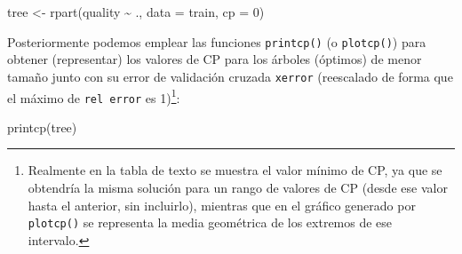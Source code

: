 \documentclass[
  spanish,
]{book}
\newenvironment{Shaded}{\begin{snugshade}}{\end{snugshade}}
\newcommand{\AttributeTok}[1]{\textcolor[rgb]{0.77,0.63,0.00}{#1}}
\newcommand{\DecValTok}[1]{\textcolor[rgb]{0.00,0.00,0.81}{#1}}
\newcommand{\FunctionTok}[1]{\textcolor[rgb]{0.00,0.00,0.00}{#1}}
\newcommand{\NormalTok}[1]{#1}
\newcommand{\OtherTok}[1]{\textcolor[rgb]{0.56,0.35,0.01}{#1}}
\newcommand{\SpecialCharTok}[1]{\textcolor[rgb]{0.00,0.00,0.00}{#1}}
\theoremstyle{break}
\theoremstyle{definition}
\theoremstyle{definition}
\theoremstyle{definition}
\theoremstyle{definition}
\theoremstyle{remark}
\begin{document}
\begin{Shaded}
\begin{Highlighting}[]
\NormalTok{tree }\OtherTok{\textless{}{-}} \FunctionTok{rpart}\NormalTok{(quality }\SpecialCharTok{\textasciitilde{}}\NormalTok{ ., }\AttributeTok{data =}\NormalTok{ train, }\AttributeTok{cp =} \DecValTok{0}\NormalTok{)}
\end{Highlighting}
\end{Shaded}

Posteriormente podemos emplear las funciones \texttt{printcp()} (o \texttt{plotcp()}) para obtener (representar)
los valores de CP para los árboles (óptimos) de menor tamaño junto con su error de validación cruzada
\texttt{xerror} (reescalado de forma que el máximo de \texttt{rel\ error} es 1)\footnote{Realmente en la tabla de texto se muestra el valor mínimo de CP, ya que se obtendría la misma solución para un rango de valores de CP (desde ese valor hasta el anterior, sin incluirlo), mientras que en el gráfico generado por \texttt{plotcp()} se representa la media geométrica de los extremos de ese intervalo.}:

\begin{Shaded}
\begin{Highlighting}[]
\FunctionTok{printcp}\NormalTok{(tree)}
\end{Highlighting}
\end{Shaded}
\end{document}
